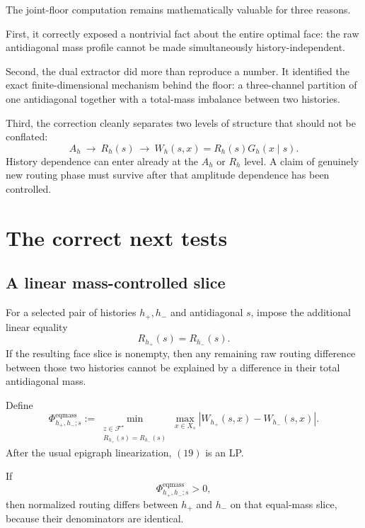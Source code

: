 \documentclass[11pt,a4paper]{article}
\newcommand{\F}{\mathcal F}
\begin{document}
The joint-floor computation remains mathematically valuable for three reasons.

First, it correctly exposed a nontrivial fact about the entire optimal face:
the raw antidiagonal mass profile cannot be made simultaneously
history-independent.

Second, the dual extractor did more than reproduce a number.  It identified
the exact finite-dimensional mechanism behind the floor: a three-channel
partition of one antidiagonal together with a total-mass imbalance between two
histories.

Third, the correction cleanly separates two levels of structure that should
not be conflated:
\[
\boxed{
A_h
\ \longrightarrow\
R_h(s)
\ \longrightarrow\
W_h(s,x)
=
R_h(s)G_h(x\mid s).
}
\tag{17}
\]
History dependence can enter already at the \(A_h\) or \(R_h\) level.
A claim of genuinely new routing phase must survive after that amplitude
dependence has been controlled.

\section{The correct next tests}

\subsection{A linear mass-controlled slice}

For a selected pair of histories \(h_+,h_-\) and antidiagonal \(s\), impose
the additional linear equality
\begin{equation}
\boxed{
R_{h_+}(s)=R_{h_-}(s).
}
\tag{18}
\end{equation}
If the resulting face slice is nonempty, then any remaining raw routing
difference between those two histories cannot be explained by a difference in
their total antidiagonal mass.

Define
\begin{equation}
\Phi^{\mathrm{eqmass}}_{h_+,h_-;s}
:=
\min_{\substack{z\in\F^\star\\
R_{h_+}(s)=R_{h_-}(s)}}
\max_{x\in X_s}
\left|
W_{h_+}(s,x)-W_{h_-}(s,x)
\right|.
\tag{19}
\end{equation}
After the usual epigraph linearization, \((19)\) is an LP.

If
\[
\Phi^{\mathrm{eqmass}}_{h_+,h_-;s}>0,
\]
then normalized routing differs between \(h_+\) and \(h_-\) on that
equal-mass slice, because their denominators are identical.
\end{document}
